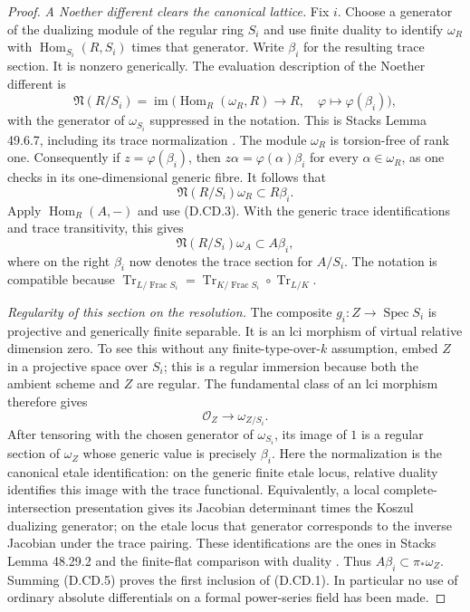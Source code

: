 \begin{proof}
\emph{A Noether different clears the canonical lattice.}
Fix $i$. Choose a generator of the dualizing module of the regular ring
$S_i$ and use finite duality to identify $\omega_R$ with
$\operatorname{Hom}_{S_i}(R,S_i)$ times that generator.
Write $\beta_i$ for the resulting trace section. It is nonzero generically.
The evaluation description of the Noether different is
\[
 \mathfrak N(R/S_i)=
 \operatorname{im}\bigl(\operatorname{Hom}_R(\omega_R,R)
       \longrightarrow R,\quad \varphi\longmapsto\varphi(\beta_i)\bigr),
                                                               \tag{D.CD.4}
\]
with the generator of $\omega_{S_i}$ suppressed in the notation.
This is Stacks Lemma 49.6.7, including its trace normalization
\citep[Tags 0BVT and 0DWM, Lemmas 49.6.7 and 49.15.1--2]
{C_StacksCanonicalDefect}.
The module $\omega_R$ is torsion-free of rank one. Consequently if
$z=\varphi(\beta_i)$, then $z\alpha=\varphi(\alpha)\beta_i$ for every
$\alpha\in\omega_R$, as one checks in its one-dimensional generic fibre.
It follows that
\[
 \mathfrak N(R/S_i)\omega_R\subset R\beta_i.
\]
Apply $\operatorname{Hom}_R(A,-)$ and use (D.CD.3). With the generic
trace identifications and trace transitivity, this gives
\[
 \mathfrak N(R/S_i)\omega_A\subset A\beta_i,            \tag{D.CD.5}
\]
where on the right $\beta_i$ now denotes the trace section for $A/S_i$.
The notation is compatible because
$\operatorname{Tr}_{L/\operatorname{Frac}S_i}
=\operatorname{Tr}_{K/\operatorname{Frac}S_i}\circ
 \operatorname{Tr}_{L/K}$.

\emph{Regularity of this section on the resolution.}
The composite $g_i:Z\to\operatorname{Spec}S_i$ is projective and
generically finite separable. It is an lci morphism of virtual relative
dimension zero. To see this without any finite-type-over-$k$ assumption,
embed $Z$ in a projective space over $S_i$; this is a regular immersion
because both the ambient scheme and $Z$ are regular. The fundamental
class of an lci morphism therefore gives
\[
 \mathcal O_Z\longrightarrow \omega_{Z/S_i}.
\]
After tensoring with the chosen generator of $\omega_{S_i}$, its image of
$1$ is a regular section of $\omega_Z$ whose generic value is precisely
$\beta_i$. Here the normalization is the canonical etale identification:
on the generic finite etale locus, relative duality identifies this image
with the trace functional. Equivalently, a local complete-intersection
presentation gives its Jacobian determinant times the Koszul dualizing
generator; on the etale locus that generator corresponds to the inverse
Jacobian under the trace pairing. These identifications are the ones in
Stacks Lemma 48.29.2 and the finite-flat comparison with duality
\citep[Tags 0E9Z and 0DWM; Lemmas 48.29.2 and 49.15.1--2]
{C_StacksCanonicalDefect}. Thus
$A\beta_i\subset\pi_*\omega_Z$. Summing (D.CD.5) proves the first
inclusion of (D.CD.1). In particular no use of ordinary absolute
differentials on a formal power-series field has been made.


\end{proof}
